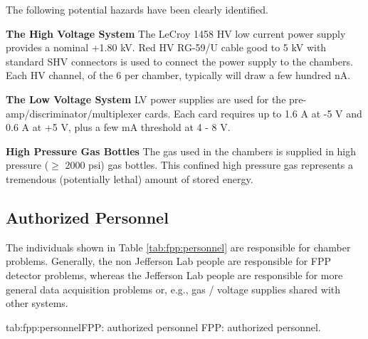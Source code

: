 \begin{safetyen}{10}{10}
The following potential hazards have been clearly identified.

\begin{description}

\item {\bf The High Voltage System}
The LeCroy 1458 HV low current power supply provides a nominal
+1.80 kV.
Red HV RG-59/U cable good to 5 kV with standard SHV connectors is used
to connect the power supply to the chambers.
Each HV channel, of the 6 per chamber, typically will draw a few hundred nA.

\item {\bf The Low Voltage System}
LV power supplies are used for the pre-amp/discriminator/multiplexer
cards.
Each card requires up to 
1.6 A at -5 V and 0.6 A at +5 V, plus a few mA threshold at 4 - 8 V.

\item{\bf High Pressure Gas Bottles} The  gas used 
in the chambers is supplied in high pressure ($\ge$ 2000 psi) gas
bottles. This confined high pressure gas represents a tremendous
(potentially lethal) amount of stored energy.
\end{description}
\end{safetyen}

\begin{safetyen}{10}{15}
\section{Authorized Personnel}
\end{safetyen}

The individuals shown in Table \ref{tab:fpp:personnel} are responsible for 
chamber problems. Generally, the non Jefferson Lab people are responsible for
FPP detector problems, whereas the Jefferson Lab people are responsible
for more general data acquisition problems or, e.g., gas / voltage supplies
shared with other systems.
\begin{namestab}{tab:fpp:personnel}{FPP: authorized personnel}{%
      FPP: authorized personnel.}
  \JackSegal{}
\end{namestab}

